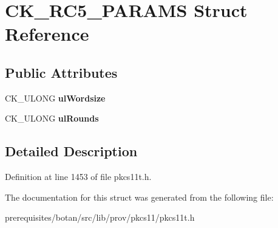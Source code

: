 \hypertarget{struct_c_k___r_c5___p_a_r_a_m_s}{}\section{C\+K\+\_\+\+R\+C5\+\_\+\+P\+A\+R\+A\+MS Struct Reference}
\label{struct_c_k___r_c5___p_a_r_a_m_s}
\subsection*{Public Attributes}
\begin{DoxyCompactItemize}
\item 
\mbox{\label{struct_c_k___r_c5___p_a_r_a_m_s_a3cd08884d3889efe696eeccbc2516aa5}} 
C\+K\+\_\+\+U\+L\+O\+NG {\bfseries ul\+Wordsize}
\item 
\mbox{\label{struct_c_k___r_c5___p_a_r_a_m_s_a2b562353a63ec7727f7348957702de03}} 
C\+K\+\_\+\+U\+L\+O\+NG {\bfseries ul\+Rounds}
\end{DoxyCompactItemize}


\subsection{Detailed Description}


Definition at line 1453 of file pkcs11t.\+h.



The documentation for this struct was generated from the following file\+:\begin{DoxyCompactItemize}
\item 
prerequisites/botan/src/lib/prov/pkcs11/pkcs11t.\+h\end{DoxyCompactItemize}
